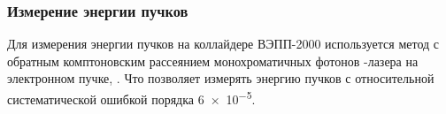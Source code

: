 \subsubsection{Измерение энергии пучков}

Для измерения энергии пучков на коллайдере ВЭПП-2000 используется метод с обратным комптоновским рассеянием монохроматичных фотонов -лазера на электронном пучке, \cite{laserBeamAbakumova2014}.
Что позволяет измерять энергию пучков с относительной систематической ошибкой порядка \num{6e-5}.



